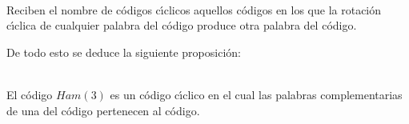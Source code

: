 \begin{definicion}
\ \\
Reciben el nombre de c\'odigos c\'{\i}clicos aquellos c\'odigos en los que la
rotaci\'on c\'{\i}clica de cualquier palabra del c\'odigo produce otra palabra
del c\'odigo.
\end{definicion}

De todo esto se deduce la siguiente proposici\'on:
\begin{proposicion}
\ \\
El c\'odigo $Ham(3)$ es un c\'odigo c\'{\i}clico en el cual las palabras
complementarias de una del c\'odigo pertenecen al c\'odigo.
\end{proposicion}
